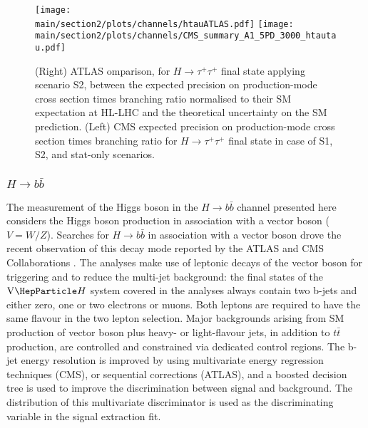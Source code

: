 \begin{figure}[h!]
\begin{center}
\texttt{[image: \\main/section2/plots/channels/htauATLAS.pdf]}
\texttt{[image: \\main/section2/plots/channels/CMS\_summary\_A1\_5PD\_3000\_htautau.pdf]}
\end{center}
\caption{(Right) ATLAS omparison, for $H \to \tau^{+}\tau^{+}$ final state applying scenario S2, between the expected precision on production-mode cross section times branching ratio normalised to their SM expectation at HL-LHC and the theoretical uncertainty on the SM prediction. (Left) CMS expected precision on production-mode cross section times branching ratio for $H \to \tau^{+}\tau^{+}$ final state in case of S1, S2, and stat-only scenarios.
}
\label{fig:htt_proj}
\end{figure}


\subsubsection{$H \to b\bar{b}$}

The measurement of the Higgs boson  in the $H \to b\bar{b}$ channel presented here considers the Higgs boson production in association with a vector boson ($V=W/Z$). 
Searches for $H \to b\bar{b}$  in association with a vector boson drove the recent observation  of this decay mode reported by the ATLAS and CMS Collaborations \cite{Aaboud:2018zhk,Sirunyan:2018kst}.
The analyses make use of leptonic decays of the vector boson for triggering and to reduce the multi-jet background: the final states
of the $\vh$ system covered in the analyses always contain two b-jets and either zero, one or two electrons or muons. Both leptons are required to have the same flavour in the two lepton selection.
Major backgrounds arising from SM production of vector boson plus heavy- or light-flavour jets, in addition to $t\bar{t}$ production, are 
controlled and constrained via dedicated control regions. The  b-jet energy resolution is improved by using multivariate energy regression techniques (CMS), or sequential corrections (ATLAS), and a boosted decision tree is used to improve the discrimination 
between signal and background. The distribution of this multivariate discriminator is used as the discriminating
variable in the signal extraction fit. 

